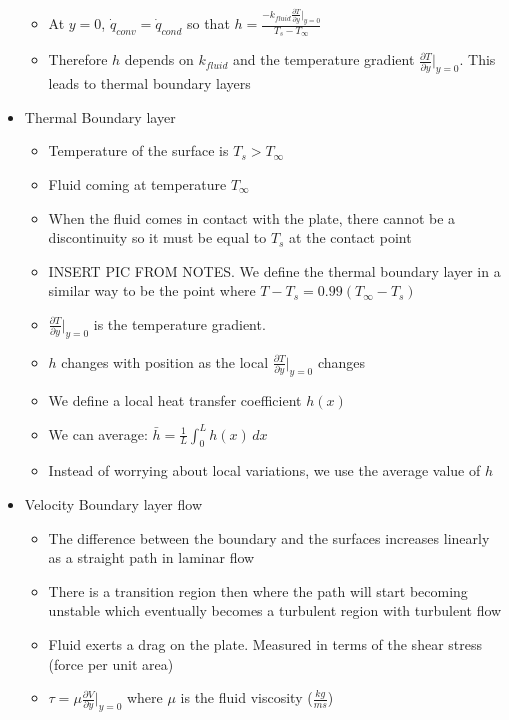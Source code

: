 \documentclass[12pt]{article}
\begin{document}
\begin{itemize}
\begin{itemize}
        \item At $y = 0$, $\dot{q}_{conv} = \dot{q}_{cond}$ so that $h = \frac{-k_{fluid} \frac{\partial T}{\partial y} |_{y = 0} }{T_s - T_{\infty}}$
        \item Therefore $h$ depends on $k_{fluid}$ and the temperature gradient $\frac{\partial T}{\partial y} |_{y = 0}$. This leads to thermal boundary layers
    \end{itemize}
    \item Thermal Boundary layer \begin{itemize}
        \item Temperature of the surface is $T_s > T_{\infty}$
        \item Fluid coming at temperature $T_{\infty}$
        \item When the fluid comes in contact with the plate, there cannot be a discontinuity so it must be equal to $T_s$ at the contact point
        \item INSERT PIC FROM NOTES. We define the thermal boundary layer in a similar way to be the point where $T - T_s = 0.99(T_{\infty} - T_s)$
        \item $\frac{\partial T}{\partial y} |_{y = 0}$ is the temperature gradient. 
        \item $h$ changes with position as the local $\frac{\partial T}{\partial y} |_{y=0}$ changes
        \item We define a local heat transfer coefficient $h(x)$
        \item We can average: $\bar{h} = \frac{1}{L} \int_{0}^{L} h(x) \, dx$
        \item Instead of worrying about local variations, we use the average value of $h$
    \end{itemize}
    \item Velocity Boundary layer flow \begin{itemize}
        \item The difference between the boundary and the surfaces increases linearly as a straight path in laminar flow
        \item There is a transition region then where the path will start becoming unstable which eventually becomes a turbulent region with turbulent flow
        \item Fluid exerts a drag on the plate. Measured in terms of the shear stress (force per unit area) 
        \item $\tau = \mu \frac{\partial V}{\partial y} |_{y = 0}$ where $\mu$ is the fluid viscosity ($\frac{kg}{ms}$)

\end{itemize}
\end{itemize}
\end{document}
